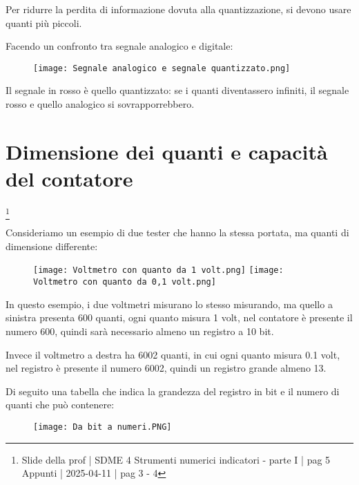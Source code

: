 Per ridurre la perdita di informazione dovuta alla quantizzazione, si devono usare quanti più piccoli. \newline 

Facendo un confronto tra segnale analogico e digitale: 

\begin{figure}[h]
    \centering
    \texttt{[image: Segnale analogico e segnale quantizzato.png]}
\end{figure}

Il segnale in rosso è quello quantizzato: se i quanti diventassero infiniti, il segnale rosso e quello analogico si sovrapporrebbero. \newline 

\newpage 

\section{Dimensione dei quanti e capacità del contatore}
\footnote{Slide della prof | SDME 4 Strumenti numerici indicatori - parte I | pag 5 \\  
Appunti | 2025-04-11 | pag 3 - 4}

Consideriamo un esempio di due tester che hanno la stessa portata, ma quanti di dimensione differente: 

\begin{figure}[h]
    \centering
    \texttt{[image: Voltmetro con quanto da 1 volt.png]}
    \texttt{[image: Voltmetro con quanto da 0,1 volt.png]}
\end{figure}

In questo esempio, i due voltmetri misurano lo stesso misurando, ma quello a sinistra presenta 600 quanti, 
ogni quanto misura 1 volt, 
nel contatore è presente il numero 600, quindi sarà necessario almeno un registro a 10 bit. \newline 

Invece il voltmetro a destra ha 6002 quanti, in cui ogni quanto misura 0.1 volt, nel registro è presente il numero 6002, 
quindi un registro grande almeno 13. \newline 

Di seguito una tabella che indica la grandezza del registro in bit e il numero di quanti che può contenere: 

\begin{figure}[h]
    \centering
    \texttt{[image: Da bit a numeri.PNG]}
\end{figure}

